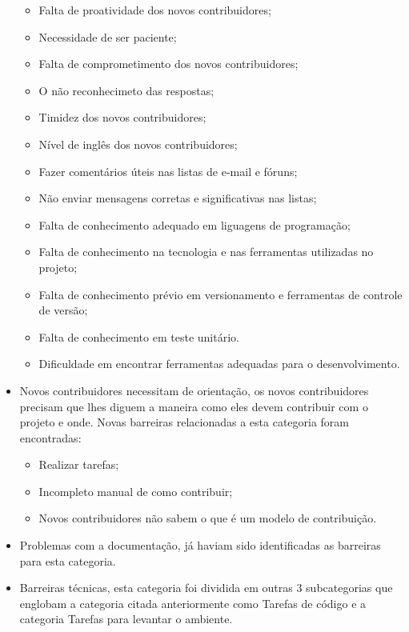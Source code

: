 \begin{itemize}
	\begin{itemize}
	\item Falta de proatividade dos novos contribuidores;
	\item Necessidade de ser paciente;
	\item Falta de comprometimento dos novos contribuidores;
	\item O não reconhecimeto das respostas;
	\item Timidez dos novos contribuidores;
	\item Nível de inglês dos novos contribuidores;
	\item Fazer comentários úteis nas listas de e-mail e fóruns;
	\item Não enviar mensagens corretas e significativas nas listas;
	\item Falta de conhecimento adequado em liguagens de programação;
	\item Falta de conhecimento na tecnologia e nas ferramentas utilizadas no projeto;
	\item Falta de conhecimento prévio em versionamento e ferramentas de controle de 
versão;
	\item Falta de conhecimento em teste unitário.
	\item Dificuldade em encontrar ferramentas adequadas para o desenvolvimento.
	\end{itemize}
 
\item Novos contribuidores necessitam de orientação, os novos contribuidores precisam
que lhes diguem a maneira como eles devem contribuir com o projeto e onde. Novas barreiras
relacionadas a esta categoria foram encontradas:
	
	\begin{itemize}
	\item Realizar tarefas;
	\item Incompleto manual de como contribuir;
	\item Novos contribuidores não sabem o que é um modelo de contribuição.
	\end{itemize}

\item Problemas com a documentação, já haviam sido identificadas as barreiras para esta categoria.

\item Barreiras técnicas, esta categoria foi dividida em outras 3 subcategorias que englobam
a categoria citada anteriormente como Tarefas de código e a categoria Tarefas para levantar o ambiente.
	

\end{itemize}
